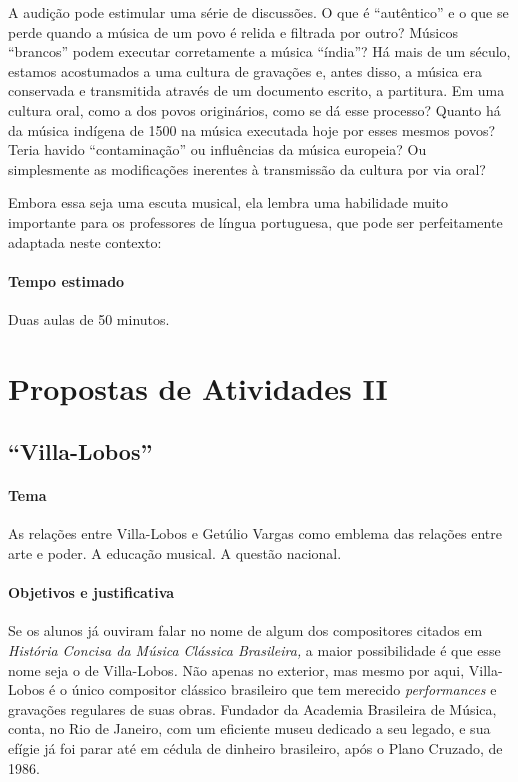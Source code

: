 \documentclass[11pt]{extarticle}
\begin{document}
A audição pode estimular uma série de discussões. O que é “autêntico”
e o que se perde quando a música de um povo é relida e filtrada por outro?
Músicos “brancos” podem executar corretamente a música “índia”? Há mais de um
século, estamos acostumados a uma cultura de gravações e, antes disso, a música
era conservada e transmitida através de um documento escrito, a partitura. Em
uma cultura oral, como a dos povos originários, como se dá esse processo?
Quanto há da música indígena de 1500 na música executada hoje por esses mesmos
povos? Teria havido “contaminação” ou influências da música europeia? Ou
simplesmente as modificações inerentes à transmissão da cultura por via oral?

Embora essa seja uma escuta musical, ela lembra uma habilidade muito importante para os professores de língua portuguesa, que pode ser perfeitamente adaptada neste contexto:


\paragraph{Tempo estimado} Duas aulas de 50 minutos.


\section{Propostas de Atividades II}

\subsection{``Villa-Lobos''}

\paragraph{Tema} As relações entre Villa-Lobos e Getúlio Vargas como
emblema das relações entre arte e poder. A educação musical. A questão
nacional.


\paragraph{Objetivos e justificativa}

Se os alunos já ouviram falar no nome de algum dos compositores citados
em \emph{História Concisa da Música Clássica Brasileira,} a maior
possibilidade é que esse nome seja o de Villa-Lobos\emph{.} Não apenas
no exterior, mas mesmo por aqui, Villa-Lobos é o único compositor
clássico brasileiro que tem merecido \emph{performances} e gravações
regulares de suas obras. Fundador da Academia Brasileira de Música,
conta, no Rio de Janeiro, com um eficiente museu dedicado a seu legado,
e sua efígie já foi parar até em cédula de dinheiro brasileiro, após o
Plano Cruzado, de 1986.
\end{document}
